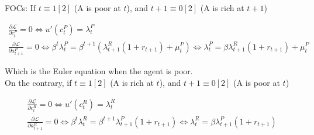 \documentclass{article}
\begin{document}




FOCs: If $t\equiv1[2]$ (A is poor at $t$), and $t+1\equiv0[2]$ (A is rich at $t+1$)

\begin{gather*}
    \frac{\partial \mathcal{L}}{\partial c_t^P}=0\Leftrightarrow u'(c_t^P)=\lambda_t^P\\
     \frac{\partial \mathcal{L}}{\partial a_{t+1}^P}=0\Leftrightarrow \beta^t\lambda_t^P=\beta^{t+1}(\lambda_{t+1}^R(1+r_{t+1})+\mu_{t}^P)\Leftrightarrow \lambda_t^P=\beta\lambda_{t+1}^R(1+r_{t+1})+\mu_{t}^P
\end{gather*}

Which is the Euler equation when the agent is poor.\\

On the contrary, if $t\equiv1[2]$ (A is rich at $t$), and $t+1\equiv0[2]$ (A is poor at $t$)

\begin{gather*}
    \frac{\partial \mathcal{L}}{\partial c_t^R}=0\Leftrightarrow u'(c_t^R)=\lambda_t^R \\
    \frac{\partial \mathcal{L}}{\partial a_{t+1}^R}=0\Leftrightarrow \beta^t\lambda_t^R=\beta^{t+1}\lambda_{t+1}^P(1+r_{t+1})\Leftrightarrow \lambda_t^R=\beta\lambda_{t+1}^P(1+r_{t+1})
\end{gather*}
\end{document}
